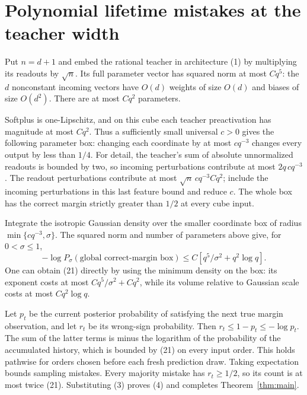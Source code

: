 \documentclass[11pt]{article}
\begin{document}
\section{Polynomial lifetime mistakes at the teacher width}
Put $n=d+1$ and embed the rational teacher in architecture (1) by
multiplying its readouts by $\sqrt n$. Its full parameter vector has
squared norm at most $Cq^5$: the $d$ nonconstant incoming vectors have
$O(d)$ weights of size $O(d)$ and biases of size $O(d^2)$.
There are at most $Cq^2$ parameters.

Softplus is one-Lipschitz, and on this cube each teacher preactivation
has magnitude at most $Cq^2$. Thus a sufficiently small universal $c>0$
gives the following parameter box: changing each coordinate by at most
$cq^{-3}$ changes every output by less than $1/4$.
For detail, the teacher's sum of absolute unnormalized readouts is
bounded by two, so incoming perturbations contribute at most
$2q\,cq^{-3}$. The readout perturbations contribute at most
$\sqrt n\,cq^{-3}Cq^2$; include the incoming perturbations in this
last feature bound and reduce $c$. The whole box has the correct margin
strictly greater than $1/2$ at every cube input.

Integrate the isotropic Gaussian density over the smaller coordinate
box of radius $\min\{cq^{-3},\sigma\}$. The squared norm and number
of parameters above give, for $0<\sigma\le1$,
\[
 -\log P_\sigma(\text{global correct-margin box})
                  \le C[q^5/\sigma^2+q^2\log q].              \tag{21}
\]
One can obtain (21) directly by using the minimum density on the box:
its exponent costs at most $Cq^5/\sigma^2+Cq^2$, while its volume
relative to Gaussian scale costs at most $Cq^2\log q$.

Let $p_t$ be the current posterior probability of satisfying the next
true margin observation, and let $r_t$ be its wrong-sign probability.
Then $r_t\le1-p_t\le-\log p_t$. The sum of the latter terms is minus
the logarithm of the probability of the accumulated history, which is
bounded by (21) on every input order. This holds pathwise for orders
chosen before each fresh prediction draw. Taking expectation bounds
sampling mistakes. Every majority mistake has $r_t\ge1/2$, so its
count is at most twice (21). Substituting (3) proves (4) and completes
Theorem~\ref{thm:main}.
\end{document}
